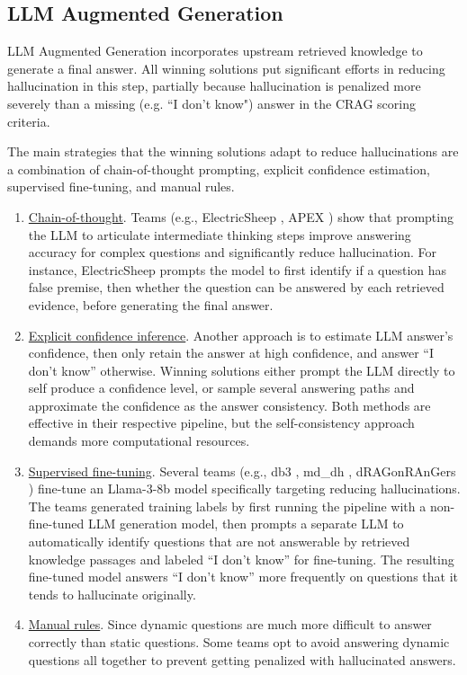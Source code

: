 \subsection{LLM Augmented Generation}
LLM Augmented Generation incorporates upstream retrieved knowledge to generate a final answer. All winning solutions put significant efforts in reducing hallucination in this step, partially because hallucination is penalized more severely than a missing (e.g. ``I don’t know") answer in the CRAG scoring criteria. 

The main strategies that the winning solutions adapt to reduce hallucinations are a combination of chain-of-thought prompting, explicit confidence estimation, supervised fine-tuning, and manual rules.

\begin{enumerate}
    \item \underline{Chain-of-thought}. Teams (e.g., ElectricSheep \cite{electricsheep}, APEX \cite{apex}) show that prompting the LLM to articulate intermediate thinking steps improve answering accuracy for complex questions and significantly reduce hallucination. For instance, ElectricSheep \cite{electricsheep} prompts the model to first identify if a question has false premise, then whether the question can be answered by each retrieved evidence, before generating the final answer. 
    \item \underline{Explicit confidence inference}. Another approach is to estimate LLM answer’s confidence, then only retain the answer at high confidence, and answer “I don’t know” otherwise. Winning solutions either prompt the LLM directly to self produce a confidence level, or sample several answering paths and approximate the confidence as the answer consistency. Both methods are effective in their respective pipeline, but the self-consistency approach demands more computational resources.  
    \item \underline{Supervised fine-tuning}. Several teams (e.g., db3 \cite{db3}, md\_dh \cite{mddh}, dRAGonRAnGers \cite{dragonrangers}) fine-tune an Llama-3-8b model specifically targeting reducing hallucinations. The teams generated training labels by first running the pipeline with a non-fine-tuned LLM generation model, then prompts a separate LLM to automatically identify questions that are not answerable by retrieved knowledge passages and labeled “I don’t know” for fine-tuning. The resulting fine-tuned model answers “I don’t know” more frequently on questions that it tends to hallucinate originally. 
    \item \underline{Manual rules}. Since dynamic questions are much more difficult to answer correctly than static questions. Some teams opt to avoid answering dynamic questions all together to prevent getting penalized with hallucinated answers.
\end{enumerate}

